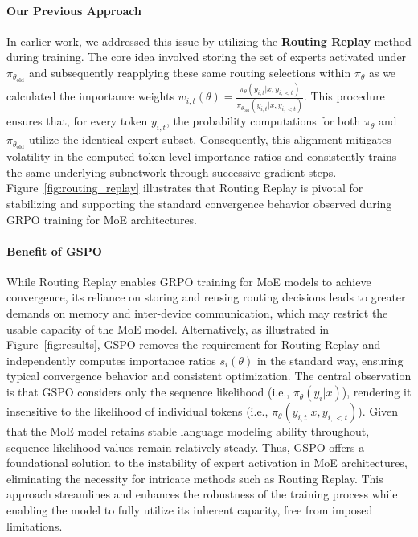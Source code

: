 \paragraph{Our Previous Approach} In earlier work, we addressed this issue by utilizing the \textbf{Routing Replay} method during training. The core idea involved storing the set of experts activated under $\pi_{\theta_\text{old}}$ and subsequently reapplying these same routing selections within $\pi_{\theta}$ as we calculated the importance weights $w_{i,t}(\theta) = \frac{ \pi_{\theta} (y_{i,t} | x, y_{i,<t}) }{ \pi_{\theta_\text{old}} (y_{i,t} | x,y_{i,<t})}$. This procedure ensures that, for every token $y_{i,t}$, the probability computations for both $\pi_{\theta}$ and $\pi_{\theta_\text{old}}$ utilize the identical expert subset. Consequently, this alignment mitigates volatility in the computed token-level importance ratios and consistently trains the same underlying subnetwork through successive gradient steps. Figure~\ref{fig:routing_replay} illustrates that Routing Replay is pivotal for stabilizing and supporting the standard convergence behavior observed during GRPO training for MoE architectures.

\paragraph{Benefit of GSPO} While Routing Replay enables GRPO training for MoE models to achieve convergence, its reliance on storing and reusing routing decisions leads to greater demands on memory and inter-device communication, which may restrict the usable capacity of the MoE model. Alternatively, as illustrated in Figure~\ref{fig:results}, GSPO removes the requirement for Routing Replay and independently computes importance ratios $s_i(\theta)$ in the standard way, ensuring typical convergence behavior and consistent optimization. The central observation is that GSPO considers only the sequence likelihood (i.e., $\pi_{\theta} (y_i | x)$), rendering it insensitive to the likelihood of individual tokens (i.e., $\pi_{\theta} (y_{i,t} | x, y_{i,<t})$). Given that the MoE model retains stable language modeling ability throughout, sequence likelihood values remain relatively steady. Thus, GSPO offers a foundational solution to the instability of expert activation in MoE architectures, eliminating the necessity for intricate methods such as Routing Replay. This approach streamlines and enhances the robustness of the training process while enabling the model to fully utilize its inherent capacity, free from imposed limitations.

